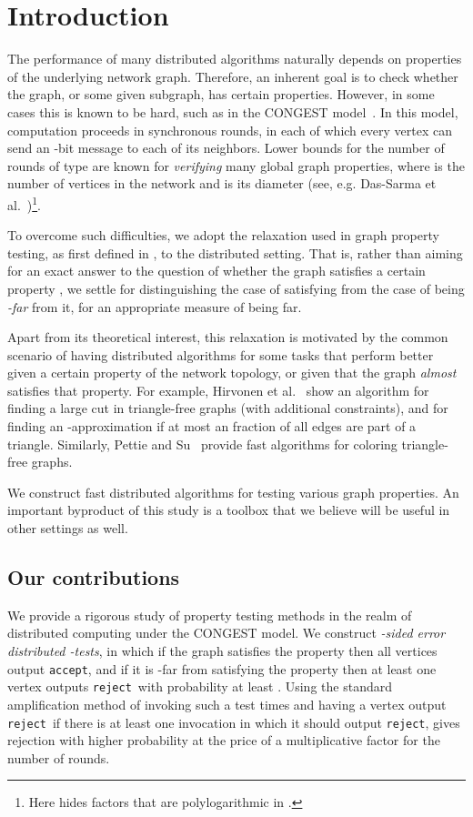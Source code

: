\documentclass[11pt]{article}
\newcommand{\accept}{\texttt{accept}}
\newcommand{\reject}{\texttt{reject}}
\begin{document}
\section{Introduction}
\label{sec:intro}

The performance of many distributed algorithms naturally depends on
properties of the underlying network graph. Therefore, an inherent goal is
to check whether the graph, or some given subgraph, has certain properties.
However, in some cases this is known to be hard, such as in the CONGEST
model~\cite{Peleg00}. In this model, computation proceeds in synchronous
rounds, in each of which every vertex can send an -bit message
to each of its neighbors. Lower bounds for the number of rounds of type
 are known for \emph{verifying} many global graph
properties, where  is the number of vertices in the network and  is
its diameter (see, e.g. Das-Sarma et
al.~\cite{SarmaHKKNPPW12})\footnote{Here  hides factors that are
polylogarithmic in .}.

To overcome such difficulties, we adopt the relaxation used in graph property testing, as first defined in \cite{GGR98,GoldreichR02}, to the distributed setting. That is, rather than aiming for an exact answer to the question of whether the graph  satisfies a certain property , we settle for distinguishing the case of satisfying  from the case of being \emph{-far} from it, for an appropriate measure of being far.

Apart from its theoretical interest, this relaxation is motivated by the common scenario of having distributed algorithms for some tasks that perform better given a certain property of the network topology, or given that the graph \emph{almost} satisfies that property. For example, Hirvonen et al.~\cite{HirvonenRSS14} show an algorithm for finding a large cut in triangle-free graphs (with additional constraints), and for finding an -approximation if at most an  fraction of all edges are part of a triangle. Similarly, Pettie and Su~\cite{PettieS15} provide fast algorithms for coloring triangle-free graphs.

We construct fast distributed algorithms for testing various graph properties. An important byproduct of this study is a toolbox that we believe will be useful in other settings as well.

\subsection{Our contributions}

We provide a rigorous study of property testing methods in the realm of distributed computing under the CONGEST model.
We construct \emph{-sided error distributed -tests}, in which if the graph satisfies the property then all vertices output \accept, and if it is -far from satisfying the property then at least one vertex outputs \reject ~with probability at least .
Using the standard amplification method of invoking such a test  times and having a vertex output \reject~if there is at least one invocation in which it should output \reject, gives rejection with higher probability at the price of a multiplicative  factor for the number of rounds.
\end{document}
